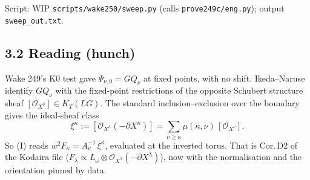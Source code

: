 \documentclass[11pt]{article}
\newcommand{\gr}[1]{\textsf{#1}}
\theoremstyle{plain}
\begin{document}
Script: WIP \texttt{scripts/wake250/sweep.py} (calls \texttt{prove249c/eng.py}); output \texttt{sweep\_out.txt}.

\subsection*{3.2 Reading (\gr{hunch})}
Wake 249's K0 test gave $\Psi_{\nu,0}=GQ_\nu$ at fixed points, with no shift. Ikeda--Naruse identify $GQ_\nu$ with the
fixed-point restrictions of the opposite Schubert structure sheaf $[\mathcal O_{X^\nu}]\in K_T(LG)$. The standard
inclusion--exclusion over the boundary gives the ideal-sheaf class
\[\xi^\kappa:=[\mathcal O_{X^\kappa}(-\partial X^\kappa)]=\sum_{\nu\ge\kappa}\mu(\kappa,\nu)\,[\mathcal O_{X^\nu}].\]
So (I) reads $w^2F_\kappa=A_\kappa^{-1}\,\xi^\kappa$, evaluated at the inverted torus. That is Cor.\,D2 of the Kodaira
file ($F_\lambda\propto L_\omega\otimes\mathcal O_{X^\lambda}(-\partial X^\lambda)$), now with the normalisation and
the orientation pinned by data.
\end{document}
